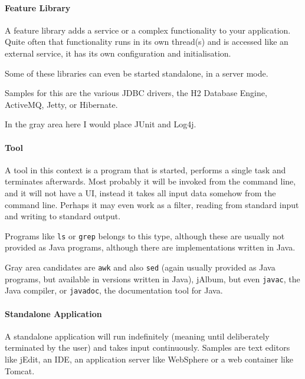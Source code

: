 \documentclass[11pt,a4paper, titlepage, parskip=half, headsepline, footsepline, cleardoublepage=current, headheight=1cm]{scrbook}
\begin{document}

\paragraph{Feature Library}\label{sec:FeatureLibrary}
A feature library adds a service or a complex functionality to your application. Quite often that functionality runs in its own thread(s) and is accessed like an external service, it has its own configuration and initialisation.

Some of these libraries can even be started standalone, in a server mode.

Samples for this are the various JDBC drivers, the H2 Database Engine\autocite{H2_DATABASE}, ActiveMQ\autocite{APACHE_ACTIVEMQ}, Jetty\autocite{ECLIPSE_JETTY}, or Hibernate\autocite{HIBERNATE_ORM}.

In the gray area here I would place JUnit\autocite{JUNIT5} and Log4j\autocite{APACHE_LOG4J}.


\paragraph{Tool}\label{sec:Tool}
A tool in this context is a program that is started, performs a single task and terminates afterwards. Most probably it will be invoked from the command line, and it will not have a UI, instead it takes all input data somehow from the command line. Perhaps it may even work as a filter\autocite{WIKIPEDIA:Filter}, reading from standard input and writing to standard output.

Programs like \verb#ls# or \verb#grep# belongs to this type, although these are usually not provided as Java programs, although there are implementations written in Java.

Gray area candidates are \verb#awk# and also \verb#sed# (again usually provided as Java programs, but available in versions written in Java), jAlbum\autocite{JALBUM}, but even \verb#javac#, the Java compiler, or \verb#javadoc#, the documentation tool for Java.


\paragraph{Standalone Application}\label{sec:StandaloneApplication}
A standalone application will run indefinitely (meaning until deliberately terminated by the user) and takes input continuously. Samples are text editors like jEdit\autocite{JEDIT}, an IDE, an application server like WebSphere\autocite{IBM_WEBSPHERE} or a web container like Tomcat\autocite{APACHE_TOMCAT}.
\end{document}
